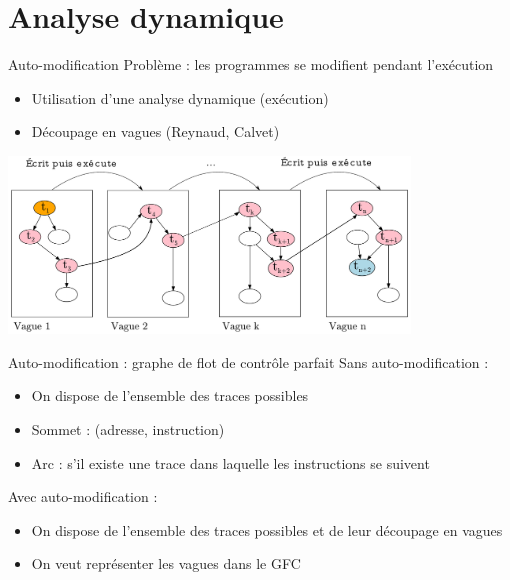 \documentclass{beamer}
\begin{document}
\section{Analyse dynamique}
\begin{frame}{Auto-modification}
Problème : les programmes se modifient pendant l'exécution
\begin{itemize}
 \item Utilisation d'une analyse dynamique (exécution)
 \item Découpage en vagues (Reynaud, Calvet)
\end{itemize}

\begin{center}
\includegraphics[width=0.8\textwidth]{supports/automodification/phases2_final_test.pdf}
\end{center}
\end{frame}

\begin{frame}{Auto-modification : graphe de flot de contrôle parfait}
Sans auto-modification :
\begin{itemize}
 \item On dispose de l'ensemble des traces possibles
 \item Sommet : (adresse, instruction)
 \item Arc : s'il existe une trace dans laquelle les instructions se suivent
\end{itemize}
Avec auto-modification :
\begin{itemize}
 \item On dispose de l'ensemble des traces possibles et de leur découpage en vagues
 \item On veut représenter les vagues dans le GFC
\end{itemize}
\end{frame}
\end{document}
